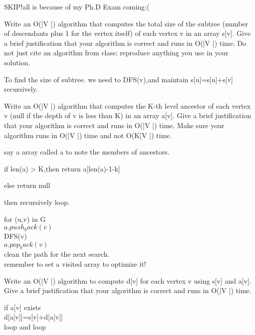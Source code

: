 \documentclass[11pt]{article}
\begin{document}

\begin{solution}
    SKIP!all is because of my Ph.D Exam coming:(
\end{solution}


\begin{subparts}
    \item Write an O(|V |) algorithm that computes the total size of the subtree (number of descendants plus 1 for the vertex itself) of each vertex v in an array s[v]. Give a brief justification that your algorithm is correct and runs in O(|V |) time. Do not just cite an algorithm from class; reproduce anything you use in your solution. \par
    \begin{solution}
        To find the size of subtree. we need to DFS(v),and maintain s[u]=s[u]+s[v] recursively. \par 
    \end{solution}

    \item Write an O(|V |) algorithm that computes the K-th level ancestor of each vertex v (null if the depth of v is less than K) in an array a[v]. Give a brief justification that your algorithm is correct and runs in O(|V |) time. Make sure your algorithm runs in O(|V |) time and not O(K|V |) time. \par
    \begin{solution}
        say a array called a to note the members of ancestors. \par
         if len(a) > K,then return a[len(a)-1-k] \par
         else return null \par
         then recursively loop. \par
         for (u,v) in G \\
         $a.push_back(v)$ \\
         DFS(v) \\
        $ a.pop_back(v)$ \\
        clean the path for the next search. \\
        remember to set a visited array to optimize it!
    \end{solution}

    \item Write an O(|V |) algorithm to compute d[v] for each vertex v using s[v] and a[v]. Give a brief justification that your algorithm is correct and runs in O(|V |) time. \par
    \begin{solution}
        if a[v] exists \\
        d[a[v]]=s[v]+d[a[v]] \\
        loop and loop~
    \end{solution}
\end{subparts}
\end{document}
